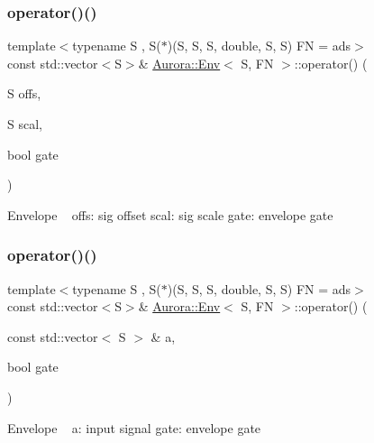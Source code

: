 \subsubsection{\texorpdfstring{operator()()}{operator()()}\hspace{0.1cm}{\footnotesize\ttfamily [2/6]}}
{\footnotesize\ttfamily template$<$typename S , S($\ast$)(\+S, S, S, double, S, S) FN = ads$>$ \\
const std\+::vector$<$S$>$\& \hyperlink{class_aurora_1_1_env}{Aurora\+::\+Env}$<$ S, FN $>$\+::operator() (\begin{DoxyParamCaption}\item[{S}]{offs,  }\item[{S}]{scal,  }\item[{bool}]{gate }\end{DoxyParamCaption})\hspace{0.3cm}{\ttfamily [inline]}}

Envelope ~\newline
offs\+: sig offset scal\+: sig scale gate\+: envelope gate \mbox{\label{class_aurora_1_1_env_a577d95d24fd9f5c5796210874623c650}} 
\subsubsection{\texorpdfstring{operator()()}{operator()()}\hspace{0.1cm}{\footnotesize\ttfamily [3/6]}}
{\footnotesize\ttfamily template$<$typename S , S($\ast$)(\+S, S, S, double, S, S) FN = ads$>$ \\
const std\+::vector$<$S$>$\& \hyperlink{class_aurora_1_1_env}{Aurora\+::\+Env}$<$ S, FN $>$\+::operator() (\begin{DoxyParamCaption}\item[{const std\+::vector$<$ S $>$ \&}]{a,  }\item[{bool}]{gate }\end{DoxyParamCaption})\hspace{0.3cm}{\ttfamily [inline]}}

Envelope ~\newline
a\+: input signal gate\+: envelope gate \mbox{\label{class_aurora_1_1_env_ae4e2dec694f0be0f0efa5b073a06fef5}} 
